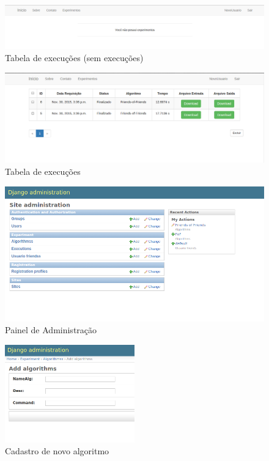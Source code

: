 \documentclass[tg]{mdtufsm}
\begin{document}
\begin{figure}
	\centering
	\includegraphics[width=1\textwidth]{res2}
	\caption{
		Tabela de execuções (sem execuções)
	}
	\label{fig:res2}
\end{figure}
\begin{figure}
	\centering
	\includegraphics[width=1\textwidth]{asd}
	\caption{
		Tabela de execuções
	}
	\label{fig:asd}
\end{figure}
\begin{figure}
	\centering
	\includegraphics[width=1\textwidth]{res4}
	\caption{
		Painel de Administração
	}
	\label{fig:res4}
\end{figure}
\begin{figure}
	\centering
	\includegraphics[width=0.5\textwidth]{res5}
	\caption{
		Cadastro de novo algoritmo
	}
	\label{fig:res5}
\end{figure}
\end{document}
